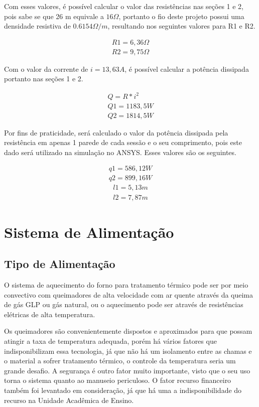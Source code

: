 Com esses valores, é possível calcular o valor das resistências nas seções 1 e 2, pois sabe se que 26 m equivale a $16 \Omega$, portanto o fio deste projeto possui uma densidade resistiva de $0.6154 \Omega /m$, resultando nos seguintes valores para R1 e R2.

\begin{gather}
    R1 = 6,36\Omega \nonumber \\
    R2 = 9,75\Omega \nonumber
\end{gather}

Com o valor da corrente de $i = 13,63 A$, é possível calcular a potência dissipada portanto nas seções 1 e 2.

\begin{gather}
    Q = R*i^{2} \\
    Q1 = 1183,5W \nonumber \\
    Q2 = 1814,5W \nonumber
\end{gather}


Por fins de praticidade, será calculado o valor da potência dissipada pela resistência em apenas 1 parede de cada sessão e o seu comprimento, pois este dado será utilizado na simulação no ANSYS\@. Esses valores são os seguintes.

\begin{gather}
    q1 = 586,12W \nonumber \\
    q2 = 899,16W \nonumber
\end{gather}
\begin{gather}
    l1 = 5,13m \nonumber \\
    l2 = 7,87m \nonumber
\end{gather}

\section{Sistema de Alimentação}

\subsection{Tipo de Alimentação}

O sistema de aquecimento do forno para tratamento térmico pode ser por meio convectivo com queimadores de alta velocidade com ar quente através da queima de gás GLP ou gás natural, ou o aquecimento pode ser através de resistências elétricas de alta temperatura.

Os queimadores são convenientemente dispostos e aproximados para que possam atingir a taxa de temperatura adequada, porém há vários fatores que indisponibilizam essa tecnologia, já que não há um isolamento entre as chamas e o material a sofrer tratamento térmico, o controle da temperatura seria um grande desafio. A segurança é outro fator muito importante, visto que o seu uso torna o sistema quanto ao manuseio periculoso. O fator recurso financeiro também foi levantado em consideração, já que há uma a indisponibilidade do recurso na Unidade Acadêmica de Ensino.

